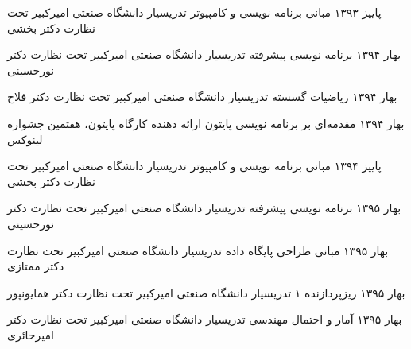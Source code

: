 \documentclass[]{friggeri-cv-fa} %
\begin{document}
\begin{entrylist}

	\entry
	{پاییز ۱۳۹۳}
	{مبانی برنامه نویسی و کامپیوتر}
	{تدریسیار}
	{دانشگاه صنعتی امیرکبیر تحت نظارت دکتر بخشی}


	\entry
	{بهار ۱۳۹۴}
	{برنامه نویسی پیشرفته}
	{تدریسیار}
	{دانشگاه صنعتی امیرکبیر تحت نظارت دکتر نورحسینی}


	\entry
	{بهار ۱۳۹۴}
	{ریاضیات گسسته}
	{تدریسیار}
	{دانشگاه صنعتی امیرکبیر تحت نظارت دکتر فلاح}


	\entry
	{بهار ۱۳۹۴}
	{مقدمه‌ای بر برنامه نویسی پایتون}
	{ارائه دهنده}
	{کارگاه پایتون، هفتمین جشواره لینوکس}


	\entry
	{پاییز ۱۳۹۴}
	{مبانی برنامه نویسی و کامپیوتر}
	{تدریسیار}
	{دانشگاه صنعتی امیرکبیر تحت نظارت دکتر بخشی}


	\entry
	{بهار ۱۳۹۵}
	{برنامه نویسی پیشرفته}
	{تدریسیار}
	{دانشگاه صنعتی امیرکبیر تحت نظارت دکتر نورحسینی}


	\entry
	{بهار ۱۳۹۵}
	{مبانی طراحی پایگاه داده}
	{تدریسیار}
	{دانشگاه صنعتی امیرکبیر تحت نظارت دکتر ممتازی}


	\entry
	{بهار ۱۳۹۵}
	{ریزپردازنده ۱}
	{تدریسیار}
	{دانشگاه صنعتی امیرکبیر تحت نظارت دکتر همایونپور}


	\entry
	{بهار ۱۳۹۵}
	{آمار و احتمال مهندسی}
	{تدریسیار}
	{دانشگاه صنعتی امیرکبیر تحت نظارت دکتر امیرحائری}



\end{entrylist}

\end{document}
